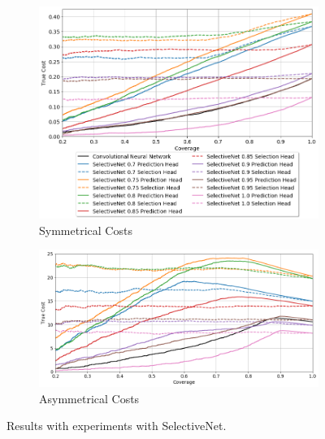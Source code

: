 \begin{figure}[!h]
	\centering
	\begin{subfigure}{\textwidth}
		\centering
		\includegraphics[width=\linewidth]{images/multi-class-selective-sym.png}
		\caption{Symmetrical Costs}	
	\end{subfigure}
	\begin{subfigure}{\textwidth}
		\centering
		\includegraphics[width=\linewidth]{images/multi-class-selective-asym.png}
		\caption{Asymmetrical Costs}
	\end{subfigure}
	\caption{Results with experiments with SelectiveNet.}
	\label{fig:multi-class-selective}
\end{figure}

